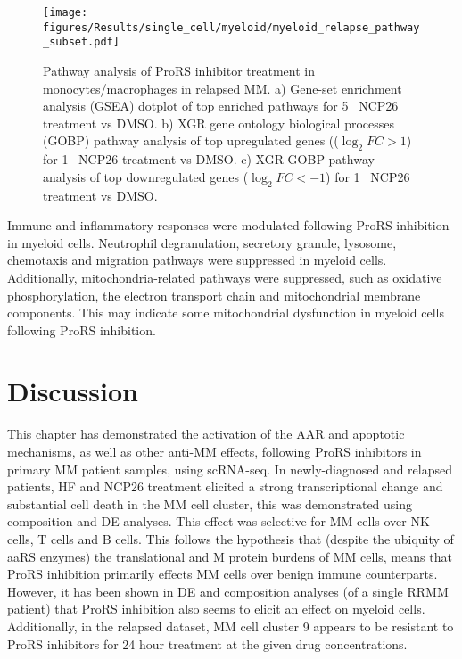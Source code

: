 \begin{figure}[htb]
\centering
\texttt{[image: figures/Results/single\_cell/myeloid/myeloid\_relapse\_pathway\_subset.pdf]}
\caption[scRNA-seq myeloid cell pathway analysis- relapsed MM]{Pathway analysis of ProRS inhibitor treatment in monocytes/macrophages in relapsed MM.
a) Gene-set enrichment analysis (GSEA) dotplot of top enriched pathways for 5\si{\micro\Molar} NCP26 treatment vs DMSO.
b) XGR gene ontology biological processes (GOBP) pathway analysis of top upregulated genes (($\log_{2}FC >1$) for 1\si{\micro\Molar} NCP26 treatment vs DMSO.
c) XGR GOBP pathway analysis of top downregulated genes ($\log_{2}FC < -1$) for 1\si{\micro\Molar} NCP26 treatment vs DMSO.
}
\label{fig:myeloid_pathway_relapsed}
\end{figure}
Immune and inflammatory responses were modulated following ProRS inhibition in myeloid cells.
Neutrophil degranulation, secretory granule, lysosome, chemotaxis and migration pathways were suppressed in myeloid cells.
Additionally, mitochondria-related pathways were suppressed, such as oxidative phosphorylation, the electron transport chain and mitochondrial membrane components.
This may indicate some mitochondrial dysfunction in myeloid cells following ProRS inhibition.


\section{Discussion}
This chapter has demonstrated the activation of the AAR and apoptotic mechanisms, as well as other anti-MM effects, following ProRS inhibitors in primary MM patient samples, using scRNA-seq.
In newly-diagnosed and relapsed patients, HF and NCP26 treatment elicited a strong transcriptional change and substantial cell death in the MM cell cluster, this was demonstrated using composition and DE analyses.
This effect was selective for MM cells over NK cells, T cells and B cells.
This follows the hypothesis that (despite the ubiquity of aaRS enzymes) the translational and M protein burdens of MM cells, means that ProRS inhibition primarily effects MM cells over benign immune counterparts.
However, it has been shown in DE and composition analyses (of a single RRMM patient) that ProRS inhibition also seems to elicit an effect on myeloid cells.
Additionally, in the relapsed dataset, MM cell cluster 9 appears to be resistant to ProRS inhibitors for 24 hour treatment at the given drug concentrations.

